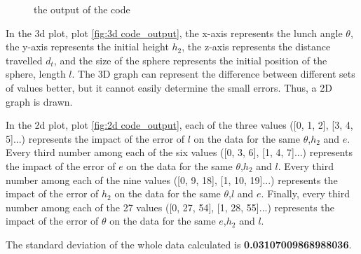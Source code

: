 \documentclass{article}
\begin{document}
    \begin{figure}[H]
        \centering
        \caption{the output of the code}
        
    \end{figure}
    In the 3d plot, plot \ref{fig:3d code_output}, the x-axis represents the lunch angle $\theta$, the y-axis represents the initial height $h_2$, the z-axis represents the distance travelled $d_t$, and the size of the sphere represents the initial position of the sphere, length $l$. The 3D graph can represent the difference between different sets of values better, but it cannot easily determine the small errors. Thus, a 2D graph is drawn. 
    
    In the 2d plot, plot \ref{fig:2d code_output}, each of the three values ([0, 1, 2], [3, 4, 5]...) represents the impact of the error of $l$ on the data for the same $\theta$,$h_2$ and $e$. Every third number among each of the six values ([0, 3, 6], [1, 4, 7]...) represents the impact of the error of $e$ on the data for the same $\theta$,$h_2$ and $l$. Every third number among each of the nine values ([0, 9, 18], [1, 10, 19]...) represents the impact of the error of $h_2$ on the data for the same $\theta$,$l$ and $e$. Finally, every third number among each of the 27 values ([0, 27, 54], [1, 28, 55]...) represents the impact of the error of $\theta$ on the data for the same $e$,$h_2$ and $l$.\par 

    The standard deviation of the whole data calculated is \textbf{0.03107009868988036}.\par
    
\end{document}
